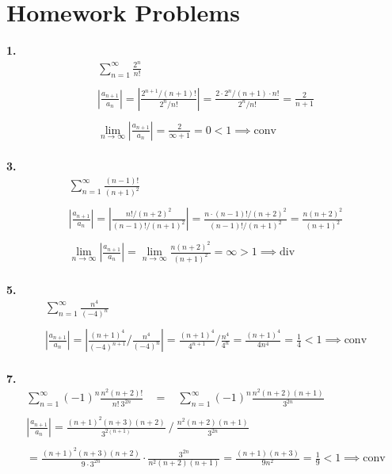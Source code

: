 \documentclass{article}
\begin{document}
\newpage

\section*{Homework Problems}



\noindent
\textbf{1.}
\begin{gather*}
\sum_{n=1}^{\infty} \frac{2^n}{n!}
\\
\\
\left|
\frac{a_{n+1}}{a_n}
\right|
=\left|
\frac{2^{n+1} / (n+1)!}{2^n / n!}
\right|
=\frac{2 \cdot 2^{n} / (n+1) \cdot n!}{2^n / n!}
=\frac{2}{n+1}
\\
\\
\lim_{n \to \infty}
\left|
\frac{a_{n+1}}{a_n}
\right|
=\frac{2}{\infty+1}=0<1 \implies \text{conv}
\end{gather*}
\hfill
\\



\noindent
\textbf{3.}
\begin{gather*}
\sum_{n=1}^{\infty} \frac{(n-1)!}{(n+1)^2}
\\
\\
\left|
\frac{a_{n+1}}{a_n}
\right|
=\left|
\frac{ n! / (n+2)^2 }{ (n-1)! / (n+1)^2 }
\right|
=\frac{ n \cdot (n-1)! / (n+2)^2 }{ (n-1)! / (n+1)^2 }
=\frac{n(n+2)^2}{(n+1)^2}
\\
\\
\lim_{n \to \infty}
\left|
\frac{a_{n+1}}{a_n}
\right|
=
\lim_{n \to \infty} \frac{n(n+2)^2}{(n+1)^2}
= \infty > 1
\implies \text{div}
\end{gather*}
\hfill
\\



\noindent
\textbf{5.}
\begin{gather*}
\sum_{n=1}^{\infty} \frac{n^4}{(-4)^n}
\\
\\
\left|
\frac{a_{n+1}}{a_n}
\right|
=\left|
\frac{(n+1)^4}{(-4)^{n+1}} / \frac{n^4}{(-4)^n}
\right|
=\frac{(n+1)^4}{4^{n+1}} / \frac{n^4}{4^n}
=\frac{(n+1)^4}{4n^4}=\frac{1}{4} < 1 \implies \text{conv}
\end{gather*}
\hfill
\\



\noindent
\textbf{7.}
\begin{gather*}
\sum_{n=1}^{\infty} (-1)^n \frac{n^2(n+2)!}{n!~3^{2n}}
~~~~=~~~~\sum_{n=1}^{\infty} (-1)^n \frac{n^2(n+2)(n+1)}{3^{2n}}
\\
\\
\left|
\frac{a_{n+1}}{a_n}
\right|
=\frac{(n+1)^2(n+3)(n+2)}{3^{2(n+1)}} ~/~ \frac{n^2(n+2)(n+1)}{3^{2n}}
\\
\\
=\frac{(n+1)^2(n+3)(n+2)}{9 \cdot 3^{2n}} \cdot \frac{3^{2n}}{n^2(n+2)(n+1)}
=\frac{(n+1)(n+3)}{9n^2}=\frac{1}{9} < 1 \implies \text{conv}
\end{gather*}
\hfill
\\
\end{document}

